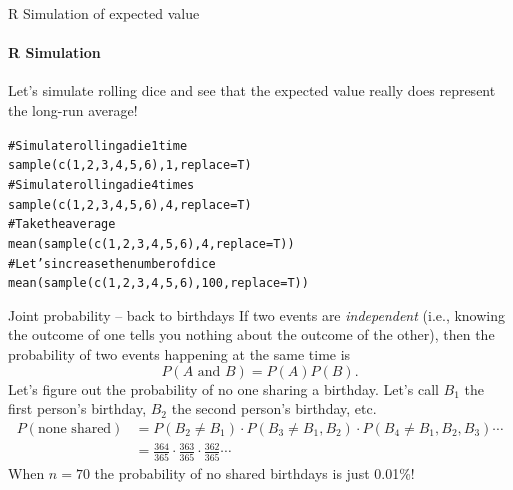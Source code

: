 \documentclass{beamer}\usepackage[]{graphicx}\usepackage[]{color}
\makeatletter
\newcommand{\hlnum}[1]{\textcolor[rgb]{0.824,0.412,0.118}{#1}}%
\newcommand{\hlcom}[1]{\textcolor[rgb]{0.824,0.706,0.549}{#1}}%
\newcommand{\hlstd}[1]{\textcolor[rgb]{1,0.894,0.769}{#1}}%
\newcommand{\hlkwc}[1]{\textcolor[rgb]{0.78,0.941,0.545}{#1}}%
\newcommand{\hlkwd}[1]{\textcolor[rgb]{1,0.78,0.769}{#1}}%
\newenvironment{kframe}{%
 \def\at@end@of@kframe{}%
 \ifinner\ifhmode%
  \def\at@end@of@kframe{\end{minipage}}%
  \begin{minipage}{\columnwidth}%
 \fi\fi%
 \def\FrameCommand##1{\hskip\@totalleftmargin \hskip-\fboxsep
 \colorbox{shadecolor}{##1}\hskip-\fboxsep
     \hskip-\linewidth \hskip-\@totalleftmargin \hskip\columnwidth}%
 \MakeFramed {\advance\hsize-\width
   \@totalleftmargin\z@ \linewidth\hsize
   \@setminipage}}%
 {\par\unskip\endMakeFramed%
 \at@end@of@kframe}
\newenvironment{knitrout}{}{} %
\makeatother
\begin{document}
\begin{darkframes}
\begin{frame}[fragile]{R Simulation of expected value}
\framesubtitle{R Simulation}

Let's simulate rolling dice and see that the expected value really does represent the long-run average!

\begin{knitrout}
\begin{kframe}
\begin{alltt}
\hlcom{# Simulate rolling a die 1 time}
\hlkwd{sample}\hlstd{(}\hlkwd{c}\hlstd{(}\hlnum{1}\hlstd{,} \hlnum{2}\hlstd{,} \hlnum{3}\hlstd{,} \hlnum{4}\hlstd{,} \hlnum{5}\hlstd{,} \hlnum{6}\hlstd{),} \hlnum{1}\hlstd{,} \hlkwc{replace}\hlstd{=T)}
\hlcom{# Simulate rolling a die 4 times}
\hlkwd{sample}\hlstd{(}\hlkwd{c}\hlstd{(}\hlnum{1}\hlstd{,} \hlnum{2}\hlstd{,} \hlnum{3}\hlstd{,} \hlnum{4}\hlstd{,} \hlnum{5}\hlstd{,} \hlnum{6}\hlstd{),} \hlnum{4}\hlstd{,} \hlkwc{replace}\hlstd{=T)}
\hlcom{# Take the average}
\hlkwd{mean}\hlstd{(}\hlkwd{sample}\hlstd{(}\hlkwd{c}\hlstd{(}\hlnum{1}\hlstd{,} \hlnum{2}\hlstd{,} \hlnum{3}\hlstd{,} \hlnum{4}\hlstd{,} \hlnum{5}\hlstd{,} \hlnum{6}\hlstd{),} \hlnum{4}\hlstd{,} \hlkwc{replace}\hlstd{=T))}
\hlcom{# Let's increase the number of dice}
\hlkwd{mean}\hlstd{(}\hlkwd{sample}\hlstd{(}\hlkwd{c}\hlstd{(}\hlnum{1}\hlstd{,} \hlnum{2}\hlstd{,} \hlnum{3}\hlstd{,} \hlnum{4}\hlstd{,} \hlnum{5}\hlstd{,} \hlnum{6}\hlstd{),} \hlnum{100}\hlstd{,} \hlkwc{replace}\hlstd{=T))}
\end{alltt}
\end{kframe}
\end{knitrout}
\end{frame}


\begin{frame}{Joint probability -- back to birthdays}
If two events are \emph{independent} (i.e., knowing the outcome of one tells you nothing about the outcome of the other), then the probability of two events happening at the same time is
\[ P(\text{$A$ and $B$}) = P(A)P(B). \]
\pause
Let's figure out the probability of no one sharing a birthday. Let's call $B_1$ the first person's birthday, $B_2$ the second person's birthday, etc.
\pause
\begin{align*}
P(\text{none shared}) &= P(B_2 \neq B_1) \cdot P(B_3 \neq B_1,B_2) \cdot P(B_4 \neq B_1,B_2,B_3)\cdots \\
&= \frac{364}{365} \cdot \frac{363}{365} \cdot \frac{362}{365} \cdots
\end{align*}
\pause
When $n=70$ the probability of no shared birthdays is just 0.01\%!
\end{frame}

\end{darkframes}
\end{document}

